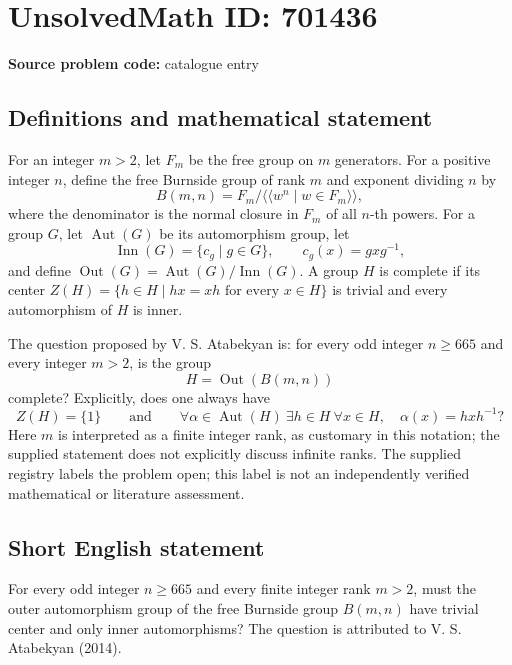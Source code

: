 \documentclass[11pt]{article}
\begin{document}
\section*{UnsolvedMath ID: 701436}
\textbf{Source problem code:} catalogue entry
\subsection{Definitions and mathematical statement}
For an integer \(m>2\), let \(F_m\) be the free group on \(m\) generators. For a positive integer \(n\), define the free Burnside group of rank \(m\) and exponent dividing \(n\) by
\[
B(m,n)=F_m/\langle\!\langle w^n\mid w\in F_m\rangle\!\rangle,
\]
where the denominator is the normal closure in \(F_m\) of all \(n\)-th powers. For a group \(G\), let \(\operatorname{Aut}(G)\) be its automorphism group, let
\[
\operatorname{Inn}(G)=\{c_g\mid g\in G\},\qquad c_g(x)=gxg^{-1},
\]
and define \(\operatorname{Out}(G)=\operatorname{Aut}(G)/\operatorname{Inn}(G)\). A group \(H\) is complete if its center \(Z(H)=\{h\in H\mid hx=xh\text{ for every }x\in H\}\) is trivial and every automorphism of \(H\) is inner.

The question proposed by V. S. Atabekyan is: for every odd integer \(n\geq 665\) and every integer \(m>2\), is the group
\[
H=\operatorname{Out}(B(m,n))
\]
complete? Explicitly, does one always have
\[
Z(H)=\{1\}\qquad\text{and}\qquad
\forall\alpha\in\operatorname{Aut}(H)\ \exists h\in H\ \forall x\in H,
\quad\alpha(x)=hxh^{-1}?
\]
Here \(m\) is interpreted as a finite integer rank, as customary in this notation; the supplied statement does not explicitly discuss infinite ranks. The supplied registry labels the problem open; this label is not an independently verified mathematical or literature assessment.
\subsection{Short English statement}
For every odd integer \(n\geq665\) and every finite integer rank \(m>2\), must the outer automorphism group of the free Burnside group \(B(m,n)\) have trivial center and only inner automorphisms? The question is attributed to V. S. Atabekyan (2014).
\end{document}
